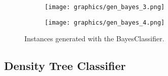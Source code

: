 \documentclass{article}
\begin{document}
\begin{figure}[h]
	\centering
	\begin{subfigure}[b]{0.4\textwidth}
		\texttt{[image: graphics/gen\_bayes\_3.png]}
	\end{subfigure}
	\begin{subfigure}[b]{0.4\textwidth}
		\texttt{[image: graphics/gen\_bayes\_4.png]}
	\end{subfigure}
	\caption{Instances generated with the BayesClassifier.}
	\label{fig1}
\end{figure}

\subsection{Density Tree Classifier} \label{dt}
\end{document}
